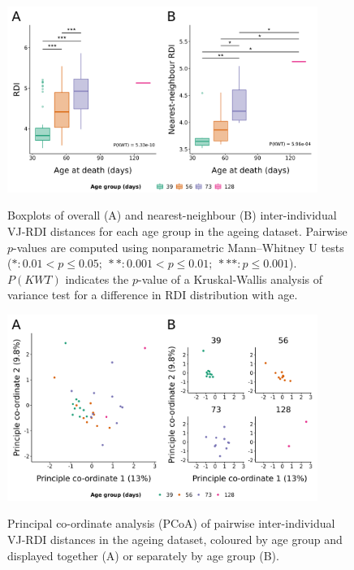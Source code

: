 \begin{figure}
\centering
\includegraphics[width = 0.9\textwidth]{_Figures/png/ageing-rdi-VJ-individual-groupdist}
\begin{subfigure}{0em}
\label{fig:igseq-ageing-rdi-VJ-individual-groupdist-all}
\end{subfigure}
\begin{subfigure}{0em}
\label{fig:igseq-ageing-rdi-VJ-individual-groupdist-nn}
\end{subfigure}
\caption{Boxplots of overall (A) and nearest-neighbour (B) inter-individual VJ-RDI distances for each age group in the \igseq ageing dataset. Pairwise $p$-values are computed using nonparametric Mann–Whitney U tests ($*: 0.01 < p \leq 0.05;~**: 0.001 < p \leq 0.01;~***: p \leq 0.001$). $P(KWT)$ indicates the $p$-value of a Kruskal-Wallis analysis of variance test for a difference in RDI distribution with age.}
\label{fig:igseq-ageing-rdi-VJ-individual-groupdist}
\end{figure}

\begin{figure}
\centering
\includegraphics[width = 0.9\textwidth]{_Figures/png/ageing-rdi-VJ-individual-pcoa}
\begin{subfigure}{0em}
\label{fig:igseq-ageing-rdi-VJ-individual-pcoa-all}
\end{subfigure}
\begin{subfigure}{0em}
\label{fig:igseq-ageing-rdi-VJ-individual-pcoa-facet}
\end{subfigure}
\caption{Principal co-ordinate analysis (PCoA) of pairwise inter-individual VJ-RDI distances in the \igseq ageing dataset, coloured by age group and displayed together (A) or separately by age group (B).}
\label{fig:igseq-ageing-rdi-VJ-individual-pcoa}
\end{figure}


